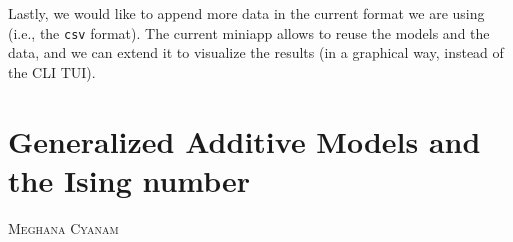 \documentclass{psu-report}
\newcommand{\chapterauthor}[1]{%
  \vspace{-2em}
  {\large \textsc{#1}\par}
  \vspace{1.5em}
}
\begin{document}
Lastly, we would like to append more data in the current format we are using
(i.e., the \texttt{csv} format).
The current miniapp allows to reuse the models and the data, and we can extend
it to visualize the results (in a graphical way, instead of the CLI TUI).

\chapter{Generalized Additive Models and the Ising number}
\chapterauthor{Meghana Cyanam}


\nocite{*} %
\printchicagobibliography


\end{document}
